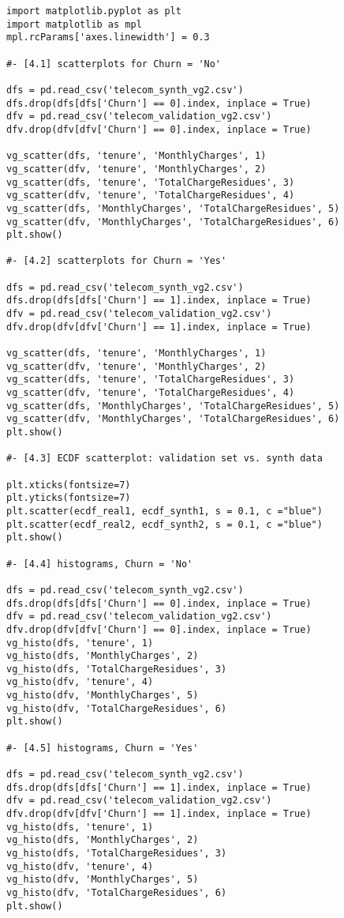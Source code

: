 \documentclass[oneside,10pt]{book}
\begin{document}
\begin{lstlisting}
import matplotlib.pyplot as plt
import matplotlib as mpl
mpl.rcParams['axes.linewidth'] = 0.3

#- [4.1] scatterplots for Churn = 'No'

dfs = pd.read_csv('telecom_synth_vg2.csv')
dfs.drop(dfs[dfs['Churn'] == 0].index, inplace = True)
dfv = pd.read_csv('telecom_validation_vg2.csv')
dfv.drop(dfv[dfv['Churn'] == 0].index, inplace = True)

vg_scatter(dfs, 'tenure', 'MonthlyCharges', 1)
vg_scatter(dfv, 'tenure', 'MonthlyCharges', 2)
vg_scatter(dfs, 'tenure', 'TotalChargeResidues', 3)
vg_scatter(dfv, 'tenure', 'TotalChargeResidues', 4)
vg_scatter(dfs, 'MonthlyCharges', 'TotalChargeResidues', 5)
vg_scatter(dfv, 'MonthlyCharges', 'TotalChargeResidues', 6)
plt.show()

#- [4.2] scatterplots for Churn = 'Yes'

dfs = pd.read_csv('telecom_synth_vg2.csv')
dfs.drop(dfs[dfs['Churn'] == 1].index, inplace = True)
dfv = pd.read_csv('telecom_validation_vg2.csv')
dfv.drop(dfv[dfv['Churn'] == 1].index, inplace = True)

vg_scatter(dfs, 'tenure', 'MonthlyCharges', 1)
vg_scatter(dfv, 'tenure', 'MonthlyCharges', 2)
vg_scatter(dfs, 'tenure', 'TotalChargeResidues', 3)
vg_scatter(dfv, 'tenure', 'TotalChargeResidues', 4)
vg_scatter(dfs, 'MonthlyCharges', 'TotalChargeResidues', 5)
vg_scatter(dfv, 'MonthlyCharges', 'TotalChargeResidues', 6)
plt.show()

#- [4.3] ECDF scatterplot: validation set vs. synth data

plt.xticks(fontsize=7)
plt.yticks(fontsize=7)
plt.scatter(ecdf_real1, ecdf_synth1, s = 0.1, c ="blue")
plt.scatter(ecdf_real2, ecdf_synth2, s = 0.1, c ="blue")
plt.show()

#- [4.4] histograms, Churn = 'No'

dfs = pd.read_csv('telecom_synth_vg2.csv')
dfs.drop(dfs[dfs['Churn'] == 0].index, inplace = True)
dfv = pd.read_csv('telecom_validation_vg2.csv')
dfv.drop(dfv[dfv['Churn'] == 0].index, inplace = True)
vg_histo(dfs, 'tenure', 1)
vg_histo(dfs, 'MonthlyCharges', 2)
vg_histo(dfs, 'TotalChargeResidues', 3)
vg_histo(dfv, 'tenure', 4)
vg_histo(dfv, 'MonthlyCharges', 5)
vg_histo(dfv, 'TotalChargeResidues', 6)
plt.show()

#- [4.5] histograms, Churn = 'Yes'

dfs = pd.read_csv('telecom_synth_vg2.csv')
dfs.drop(dfs[dfs['Churn'] == 1].index, inplace = True)
dfv = pd.read_csv('telecom_validation_vg2.csv')
dfv.drop(dfv[dfv['Churn'] == 1].index, inplace = True)
vg_histo(dfs, 'tenure', 1)
vg_histo(dfs, 'MonthlyCharges', 2)
vg_histo(dfs, 'TotalChargeResidues', 3)
vg_histo(dfv, 'tenure', 4)
vg_histo(dfv, 'MonthlyCharges', 5)
vg_histo(dfv, 'TotalChargeResidues', 6)
plt.show()
\end{lstlisting}
\end{document}
